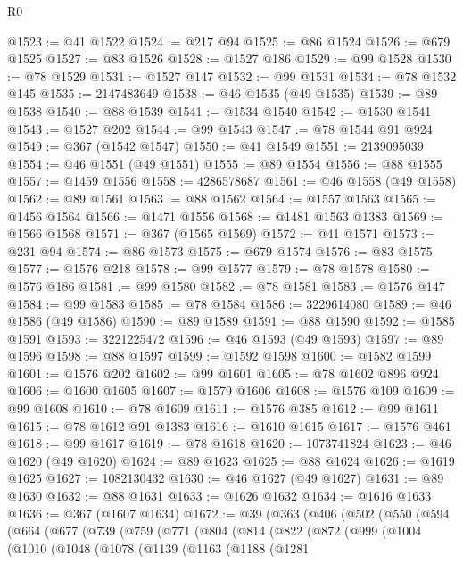 \begin{lexlean}{R0}
\begin{coremodule}
@1523 := @41 @1522
@1524 := @217 @94
@1525 := @86 @1524
@1526 := @679 @1525
@1527 := @83 @1526
@1528 := @1527 @186
@1529 := @99 @1528
@1530 := @78 @1529
@1531 := @1527 @147
@1532 := @99 @1531
@1534 := @78 @1532 @145
@1535 := 2147483649
@1538 := @46 @1535 (@49 @1535)
@1539 := @89 @1538
@1540 := @88 @1539
@1541 := @1534 @1540
@1542 := @1530 @1541
@1543 := @1527 @202
@1544 := @99 @1543
@1547 := @78 @1544 @91 @924
@1549 := @367 (@1542 @1547)
@1550 := @41 @1549
@1551 := 2139095039
@1554 := @46 @1551 (@49 @1551)
@1555 := @89 @1554
@1556 := @88 @1555
@1557 := @1459 @1556
@1558 := 4286578687
@1561 := @46 @1558 (@49 @1558)
@1562 := @89 @1561
@1563 := @88 @1562
@1564 := @1557 @1563
@1565 := @1456 @1564
@1566 := @1471 @1556
@1568 := @1481 @1563 @1383
@1569 := @1566 @1568
@1571 := @367 (@1565 @1569)
@1572 := @41 @1571
@1573 := @231 @94
@1574 := @86 @1573
@1575 := @679 @1574
@1576 := @83 @1575
@1577 := @1576 @218
@1578 := @99 @1577
@1579 := @78 @1578
@1580 := @1576 @186
@1581 := @99 @1580
@1582 := @78 @1581
@1583 := @1576 @147
@1584 := @99 @1583
@1585 := @78 @1584
@1586 := 3229614080
@1589 := @46 @1586 (@49 @1586)
@1590 := @89 @1589
@1591 := @88 @1590
@1592 := @1585 @1591
@1593 := 3221225472
@1596 := @46 @1593 (@49 @1593)
@1597 := @89 @1596
@1598 := @88 @1597
@1599 := @1592 @1598
@1600 := @1582 @1599
@1601 := @1576 @202
@1602 := @99 @1601
@1605 := @78 @1602 @896 @924
@1606 := @1600 @1605
@1607 := @1579 @1606
@1608 := @1576 @109
@1609 := @99 @1608
@1610 := @78 @1609
@1611 := @1576 @385
@1612 := @99 @1611
@1615 := @78 @1612 @91 @1383
@1616 := @1610 @1615
@1617 := @1576 @461
@1618 := @99 @1617
@1619 := @78 @1618
@1620 := 1073741824
@1623 := @46 @1620 (@49 @1620)
@1624 := @89 @1623
@1625 := @88 @1624
@1626 := @1619 @1625
@1627 := 1082130432
@1630 := @46 @1627 (@49 @1627)
@1631 := @89 @1630
@1632 := @88 @1631
@1633 := @1626 @1632
@1634 := @1616 @1633
@1636 := @367 (@1607 @1634)
@1672 := @39
    (@363
      (@406
        (@502
          (@550
            (@594
              (@664
                (@677
                  (@739
                    (@759
                      (@771
                        (@804
                          (@814
                            (@822
                              (@872
                                (@999
                                  (@1004
                                    (@1010
                                      (@1048
                                        (@1078
                                          (@1139
                                            (@1163
                                              (@1188
                                                (@1281

\end{coremodule}
\end{lexlean}
